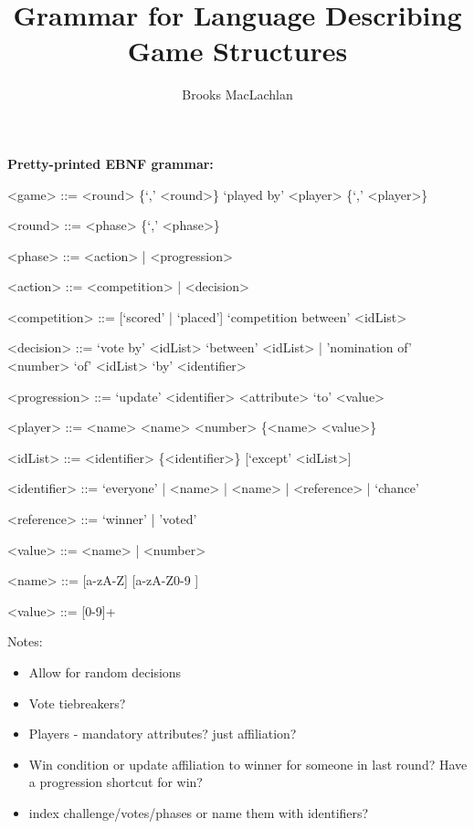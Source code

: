 \documentclass{article}
\title{Grammar for Language Describing Game Structures}
\author{Brooks MacLachlan}
\begin{document}
\maketitle

\noindent \textbf{Pretty-printed EBNF grammar:}
\begin{grammar}
<game> ::= <round> \{`,' <round>\} `played by' <player> \{`,' <player>\}

<round> ::= <phase> \{`,' <phase>\}

<phase> ::= <action> | <progression>

<action> ::= <competition> | <decision>

<competition> ::= [`scored' | `placed'] `competition between' <idList>

<decision> ::= `vote by' <idList> `between' <idList> | 'nomination of' <number> 
`of' <idList> `by' <identifier> %

<progression> ::= `update' <identifier> <attribute> `to' <value>

<player> ::= <name> <name> <number> \{<name> <value>\} %

<idList> ::= <identifier> \{<identifier>\} [`except' <idList>]

<identifier> ::= `everyone' | <name> | <name> | <reference> | `chance' %

<reference> ::= `winner' | 'voted'

<value> ::= <name> | <number>

<name> ::= [a-zA-Z] {[a-zA-Z0-9 ]}

<value> ::= [0-9]+

\end{grammar}


Notes:
\begin{itemize}
	\item Allow for random decisions
	\item Vote tiebreakers?
	\item Players - mandatory attributes? just affiliation?
	\item Win condition or update affiliation to winner for someone in last 
	round? Have a progression shortcut for win?
	\item index challenge/votes/phases or name them with identifiers?
\end{itemize}
\end{document}
